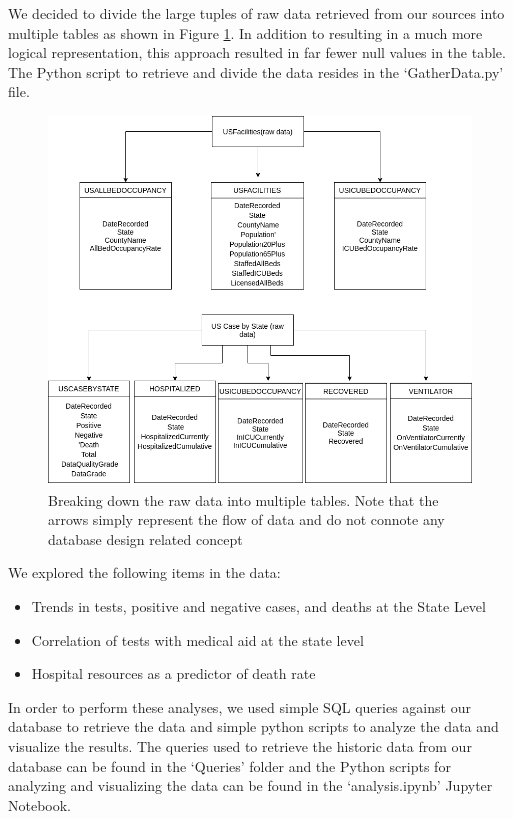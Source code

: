 \documentclass[11pt]{article}
\begin{document}
\noindent
We decided to divide the large tuples of raw data retrieved from our sources into multiple tables as shown in Figure \ref{fig:tbl_bd}. In addition to resulting in a much more logical representation, this approach resulted in far fewer null values in the table. The Python script to retrieve and divide the data resides in the `GatherData.py' file.

\FloatBarrier
\begin{figure}[h]
    \centering
    \includegraphics[width=\textwidth]{diagrams/data_breakdown.png}
    \caption{Breaking down the raw data into multiple tables. Note that the arrows simply represent the flow of data and do not connote any database design related concept}
    \label{fig:tbl_bd}
\end{figure}
\FloatBarrier

\noindent
We explored the following items in the data:
\begin{itemize}
    \item Trends in tests, positive and negative cases, and deaths at the State Level
    \item Correlation of tests with medical aid at the state level
    \item Hospital resources as a predictor of death rate
\end{itemize}
In order to perform these analyses, we used simple SQL queries against our database to retrieve the data and simple python scripts to analyze the data and visualize the results. The queries used to retrieve the historic data from our database can be found in the `Queries' folder and the Python scripts for analyzing and visualizing the data can be found in the `analysis.ipynb' Jupyter Notebook.
\end{document}
